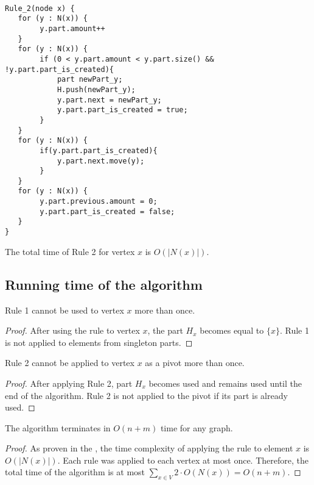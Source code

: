\begin{verbatim}

Rule_2(node x) {
   for (y : N(x)) {
        y.part.amount++
   }
   for (y : N(x)) {
        if (0 < y.part.amount < y.part.size() && !y.part.part_is_created){
            part newPart_y;
            H.push(newPart_y);
            y.part.next = newPart_y;
            y.part.part_is_created = true;
        }
   }
   for (y : N(x)) {
        if(y.part.part_is_created){
            y.part.next.move(y);
        }
   }
   for (y : N(x)) {
        y.part.previous.amount = 0;
        y.part.part_is_created = false;
   } 
}
\end{verbatim}

The total time of Rule 2 for vertex $x$ is $O(|N(x)|)$.
\label{Implementation}

\subsection{Running time of the algorithm}

\begin{theorem}
    Rule 1 cannot be used to vertex $x$ more than once.
\end{theorem}
\begin{proof}
After using the rule to vertex $x$, the part $H_x$ becomes equal to $\{x\}$. Rule 1 is not applied to elements from singleton parts.
\end{proof}

\begin{theorem}
    Rule 2 cannot be applied to vertex $x$ as a pivot more than once.
\end{theorem}

\begin{proof}
After applying Rule 2, part $H_x$ becomes used and remains used until the end of the algorithm. Rule 2 is not applied to the pivot if its part is already used.
\end{proof}

\begin{theorem}
    The algorithm terminates in $O(n+m)$ time for any graph.
    \label{Running time of the factorizing permutation construction algorithm}
\end{theorem}

\begin{proof}
As proven in the , the time complexity of applying the rule to element $x$ is 
$O(|N(x)|)$. Each rule was applied to each vertex at most once. Therefore, the total time of the algorithm is at most $\sum\limits_{x \in V} 2 \cdot O(N(x)) = O(n+m)$. 

\end{proof}

